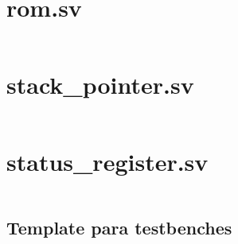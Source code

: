 \documentclass[
	12pt,				  %
	openright,		%
	a4paper,			%
	english,			%
	french,				%
	spanish,			%
	brazil,				%
]{abntex2}
\begin{document}
\begin{apendicesenv}
	\chapter{rom.sv}\label{attach:rom}
	\inputminted[breaklines]{systemverilog}{../quartus/synthesis/rom.sv}

	\chapter{stack{\_}pointer.sv}\label{attach:sp}
	\inputminted[breaklines]{systemverilog}{../quartus/synthesis/stack_pointer.sv}

	\chapter{status{\_}register.sv}\label{attach:status_reg}
	\inputminted[breaklines]{systemverilog}{../quartus/synthesis/status_register.sv}
\end{apendicesenv}



\begin{anexosenv}
	\chapter{Template para testbenches}\label{attach:template}
	\inputminted{systemverilog}{../quartus/testbenches/template.test.sv}
\end{anexosenv}


\clearpage



\printindex
\end{document}
